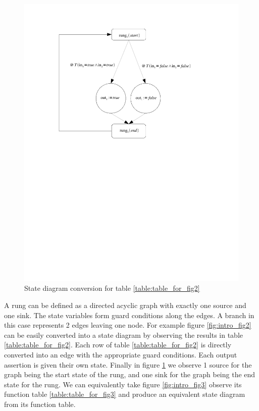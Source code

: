 \begin{figure}[h]
    \centering
    \includegraphics[trim= 0 140mm 40mm 10mm, clip, width=\imgmed]{./images/intro_and_graph.pdf} %
    \caption{State diagram conversion for table \ref{table:table_for_fig2}}
    \label{fig:intro_and_graph}
\end{figure}

A rung can be defined as a directed acyclic graph with exactly one source and one sink. The state variables form guard conditions along the edges. A branch in this case represents 2 edges leaving one node. For example figure \ref{fig:intro_fig2}
can be easily converted into a state diagram by observing the results in table \ref{table:table_for_fig2}. 
Each row of table \ref{table:table_for_fig2} is directly converted into an edge with the appropriate guard conditions.
Each output assertion is given their own state. Finally in figure \ref{fig:intro_and_graph} we observe 1 source for the
graph being the start state of the rung, and one sink for the graph being the end state for the rung. We can equivalently take figure \ref{fig:intro_fig3} observe its function table \ref{table:table_for_fig3} and produce an equivalent state diagram from its function table.


